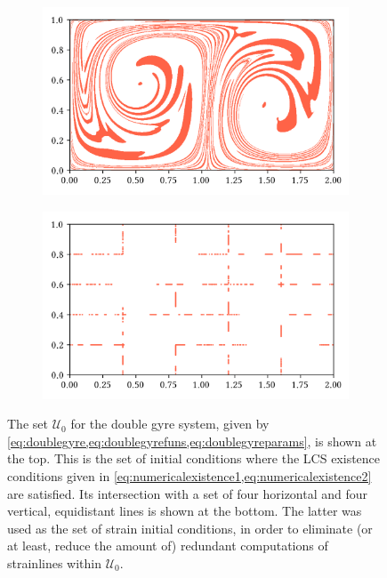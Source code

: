 \begin{figure}[htpb]
    \centering
    \begin{subfigure}{\textwidth}
        \centering
        \includegraphics{figures/domain_figures/u0_dom.png}
    \end{subfigure}

    \begin{subfigure}{\textwidth}
        \centering
        \includegraphics{figures/domain_figures/g0_dom.png}
    \end{subfigure}
    \caption[The set $\mathcal{U}_{0}$ for the double gyre system, and the
    reduced set of strain initial conditions]{The set
        $\mathcal{U}_{0}$ for the double gyre system, given by
    \cref{eq:doublegyre,eq:doublegyrefuns,eq:doublegyreparams}, is shown at the
    top. This is the set of initial conditions where the LCS existence
    conditions given in \cref{eq:numericalexistence1,eq:numericalexistence2}
    are satisfied.  Its intersection with a set of four horizontal and four
    vertical, equidistant lines is shown at the bottom. The latter was used as
    the set of strain initial conditions, in order to eliminate (or at least,
    reduce the amount of) redundant computations of strainlines within
$\mathcal{U}_{0}$.}
    \label{fig:u0_domain}
\end{figure}

